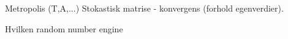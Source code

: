 
Metropolis (T,A,...)
	Stokastisk matrise  - konvergens (forhold egenverdier).
	
	Hvilken random number engine
	
